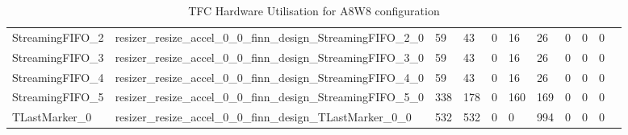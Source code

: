 \begin{landscape}
\begin{table}[!htb]
{\begin{tabular}{l|l|l|l|l|l|l|l|l|l|l}
   StreamingFIFO\_2                                        & resizer\_resize\_accel\_0\_0\_finn\_design\_StreamingFIFO\_2\_0                                      & 59         & 43         & 0       & 16   & 26    & 0      & 0      & 0            \\
   StreamingFIFO\_3                                        & resizer\_resize\_accel\_0\_0\_finn\_design\_StreamingFIFO\_3\_0                                      & 59         & 43         & 0       & 16   & 26    & 0      & 0      & 0            \\
   StreamingFIFO\_4                                        & resizer\_resize\_accel\_0\_0\_finn\_design\_StreamingFIFO\_4\_0                                      & 59         & 43         & 0       & 16   & 26    & 0      & 0      & 0            \\
   StreamingFIFO\_5                                        & resizer\_resize\_accel\_0\_0\_finn\_design\_StreamingFIFO\_5\_0                                      & 338        & 178        & 0       & 160  & 169   & 0      & 0      & 0            \\
   TLastMarker\_0                                          & resizer\_resize\_accel\_0\_0\_finn\_design\_TLastMarker\_0\_0                                        & 532        & 532        & 0       & 0    & 994   & 0      & 0      & 0            \\
\end{tabular}
}
\caption[TFC Hardware Utilisation A8W8]{TFC Hardware Utilisation for A8W8 configuration}
  \label{tab:TFCHardwareA8W8}
\end{table}


\end{landscape}
